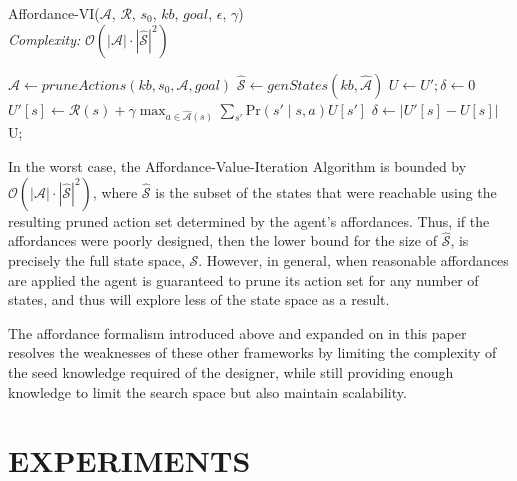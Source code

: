 \documentclass[]{article}
\newcommand{\stnote}[1]{\textcolor{Blue}{\textbf{ST: #1}}}
\begin{document}
\begin{algorithm}
  \caption{Affordance-VI($\mathcal{A}$, $\mathcal{R}$, $s_0$, $kb$, $goal$, $\epsilon$, $\gamma$) \\ {\it Complexity:} $\mathcal{O}(|\mathcal{A}|\cdot |\hat{\mathcal{S}}|^2)$}
  \begin{algorithmic}[1]
    \State $\hat{\mathcal{A}} \gets pruneActions(kb, s_0, \mathcal{A}, goal)$
    \State $\hat{\mathcal{S}} \gets genStates(kb, \hat{\mathcal{A}})$
    \State $U \gets U';\delta \gets 0$
    \State $U'[s] \gets \mathcal{R}(s) + \gamma \max_{a \in \hat{\mathcal{A}}(s)} \sum_{s'} \text{Pr}(s'\mid s,a) U[s']$
    	\State $\delta \gets |U'[s] - U[s]|$ 
    \EndIf
    \EndFor
    \EndWhile\\
    \Return U;
  \end{algorithmic}
  \label{alg:aff_vi}
\end{algorithm}

In the worst case, the Affordance-Value-Iteration Algorithm is 
bounded by $\mathcal{O}(|\mathcal{A}|\cdot |\hat{\mathcal{S}}|^2)$, where
$\hat{\mathcal{S}}$ is the subset of the states that were reachable using the
resulting pruned action set determined by the agent's affordances. Thus,
if the affordances were poorly designed, then the lower bound for the size of
$\hat{\mathcal{S}}$, is precisely the full state space, $\mathcal{S}$. However,
in general, when reasonable affordances are applied the agent is guaranteed to prune its
action set for any number of states, and thus will explore less of the state space
as a result.

The affordance formalism introduced above and expanded on in this
paper resolves the weaknesses of these other frameworks by limiting
the complexity of the seed knowledge required of the designer, while
still providing enough knowledge to limit the search space but also
maintain scalability.

\section{EXPERIMENTS}

\end{document}
